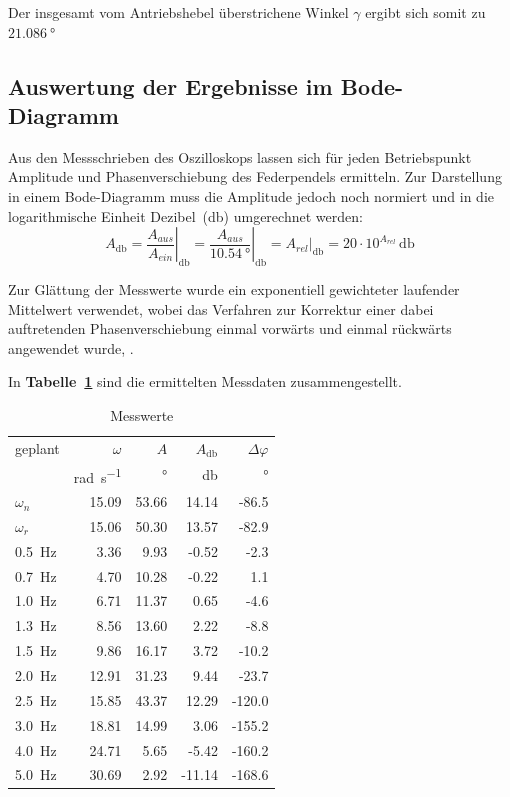 \documentclass[a4paper,12pt]{scrartcl}
\begin{document}
Der insgesamt vom Antriebshebel überstrichene Winkel $\gamma$ ergibt sich somit zu $\SI{21.086}{\degree}$


\subsection{Auswertung der Ergebnisse im Bode-Diagramm}

Aus den Messschrieben des Oszilloskops lassen sich für jeden Betriebspunkt Amplitude und Phasenverschiebung des Federpendels ermitteln.
Zur Darstellung in einem Bode-Diagramm muss die Amplitude jedoch noch normiert und in die logarithmische Einheit Dezibel~(\si{\decibel}) umgerechnet werden:
\begin{equation}
	A_{\si{\decibel}} = \left.\frac{A_{aus}}{A_{ein}}\right\rvert_{\si{\decibel}}
		= \left.\frac{A_{aus}}{\SI{10.54}{\degree}}\right\rvert_{\si{\decibel}}
		= \left.A_{rel}\right\rvert_{\si{\decibel}}
		= 20 \cdot 10^{A_{rel}} \, \si{\decibel}
\end{equation}

Zur Glättung der Messwerte wurde ein exponentiell gewichteter laufender Mittelwert verwendet, wobei das Verfahren zur Korrektur einer dabei auftretenden Phasenverschiebung einmal vorwärts und einmal rückwärts angewendet wurde, \cite{ewma}.

In \textbf{Tabelle~\ref{tab:messwerte}} sind die ermittelten Messdaten zusammengestellt.
\begin{table}[h]
	\centering
	\caption{Messwerte}
	\label{tab:messwerte}
	\begin{tabular}{lrrrr}
	\toprule
	geplant           & $\omega$&     $A$ &   $A_{\si{\decibel}}$ & $\Delta \varphi$ \\
	  & \si{\radian\per\second} & \si{\degree} & \si{\decibel} & \si{\degree} \\
	\midrule
	$\omega_n$        &  15.09 &  53.66 &  14.14 &  -86.5 \\
	$\omega_r$        &  15.06 &  50.30 &  13.57 &  -82.9 \\
	\SI{0.5}{\hertz}  &   3.36 &   9.93 &  -0.52 &   -2.3 \\
	\SI{0.7}{\hertz}  &   4.70 &  10.28 &  -0.22 &    1.1 \\
	\SI{1.0}{\hertz}  &   6.71 &  11.37 &   0.65 &   -4.6 \\
	\SI{1.3}{\hertz}  &   8.56 &  13.60 &   2.22 &   -8.8 \\
	\SI{1.5}{\hertz}  &   9.86 &  16.17 &   3.72 &  -10.2 \\
	\SI{2.0}{\hertz}  &  12.91 &  31.23 &   9.44 &  -23.7 \\
	\SI{2.5}{\hertz}  &  15.85 &  43.37 &  12.29 & -120.0 \\
	\SI{3.0}{\hertz}  &  18.81 &  14.99 &   3.06 & -155.2 \\
	\SI{4.0}{\hertz}  &  24.71 &   5.65 &  -5.42 & -160.2 \\
	\SI{5.0}{\hertz}  &  30.69 &   2.92 & -11.14 & -168.6 \\
	\bottomrule
	\end{tabular}
\end{table}
\end{document}
